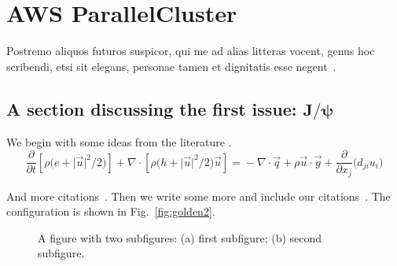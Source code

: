 

\chapter{AWS ParallelCluster}

\lipsum[1-2] Postremo aliquos futuros suspicor, qui me ad alias litteras vocent, genus hoc scribendi, etsi sit elegans, personae tamen et dignitatis esse negent~\cite{DKE1969,ww1920,kirk2288a,churchill1948,gibbs1863}.

\section[A section discussing the first issue: \(J/\psi\)]{A section discussing the first issue: \ifpdftex\(\bm{J}/\bm{\psi}\)\fi}


We begin with some ideas from the literature \cite{Fong2015,sharpe1}. 
\begin{equation}
\frac{\partial}{\partial t}\left[\rho\bigl(e + \lvert\vec{u}\rvert^2\big/2\bigr)\right]  + \nabla\cdot\left[\rho\bigl(h + \lvert\vec{u}\rvert^2\big/2 \bigr)\vec{u}\right]
 ={}-\nabla \cdot \vec{q} +  \rho \vec{u}\cdot\vec{g}+ \frac{\partial}{\partial x_j}\bigl(d_{ji}u_i\bigr)
\end{equation}
 \lipsum[3]

\lipsum[4] And more citations~\cite{sharpe1,GSL}.  Then we write some more and include our citations~\cite{Swaminathan2017IDABRO,dlmf,amsmath}. The configuration is shown in Fig.~\ref{fig:golden2}.

\begin{figure}[t]
\begin{subfigure}[c]{0.495\textwidth}
%
\subcaption{\label{fig:golden}}
\end{subfigure}
\begin{subfigure}[c]{0.495\textwidth}
%
\subcaption{\label{fig:golden2}}%
\end{subfigure}%
\caption{A figure with two subfigures: (a) first subfigure; (b) second subfigure.\label{fig:4}}
\end{figure}


